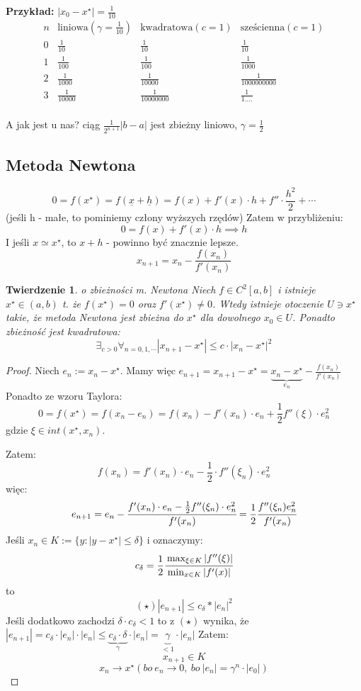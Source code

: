\documentclass[hidelinks,a4paper,fleqn,oneside]{book}
\newcommand{\ra}{\rightarrow}
\newtheorem{twierdz}{Twierdzenie}
\begin{document}
\textbf{Przykład:} $|x_0 - x^\star| = \frac{1}{10}$
\[
\begin{array}{c|c|c|c}
n & \textrm{liniowa} (\gamma = \frac{1}{10}) & \textrm{kwadratowa} (c = 1) & \textrm{sześcienna} (c=1) \\ \hline
0 & \frac{1}{10} & \frac{1}{10} & \frac{1}{10} \\
1 & \frac{1}{100} & \frac{1}{100} & \frac{1}{1000} \\
2 & \frac{1}{1000} & \frac{1}{10000} & \frac{1}{1000000000} \\
3 & \frac{1}{10000} & \frac{1}{10000000} & \frac{1}{1....} \\
\end{array}
\]

A jak jest u nas? ciąg $\frac{1}{2^{n+1}}|b-a|$ jest zbieżny liniowo, $\gamma = \frac{1}{2}$

\subsection{Metoda Newtona}

\[
	0 = f(x^\star) = f(\underline{x} + \underline{h}) = f(x) + f'(x)\cdot h + f''\cdot\frac{h^2}{2} + \cdots
\]
(jeśli h - małe, to pominiemy człony wyższych rzędów)
Zatem w przybliżeniu:
\[
	0 = f(x) + f'(x) \cdot h \implies h
\]
I jeśli $x \simeq x^\star$, to $x+h$ - powinno być znacznie lepsze.
\[
	x_{n+1} = x_n - \frac{f(x_n)}{f'(x_n)}
\]

\begin{twierdz}{o zbieżności m. Newtona}
	Niech $f \in C^2[a, b]$ i istnieje $x^\star \in (a, b)$ t. że $f(x^\star) = 0$ oraz $f'(x^\star) \neq 0$. Wtedy istnieje otoczenie $U \ni x^\star$ takie, że metoda Newtona jest zbieżna do $x^\star$ dla dowolnego $x_0 \in U$. Ponadto zbieżność jest kwadratowa:
	\[
		\exists_{c>0} \forall_{n = 0, 1, \cdots} |x_{n+1} - x^\star| \leq c \cdot |x_n - x^\star|^2
	\]
\end{twierdz}

\begin{proof}
	Niech $e_n := x_n - x^\star$. Mamy więc $e_{n+1} = x_{n+1} - x^\star = \underbrace{x_n - x^\star}_{e_n} - \frac{f(x_n)}{f'(x_n)}$
	Ponadto ze wzoru Taylora:
	\[
	0 = f(x^\star) = f(x_n - e_n) = f(x_n) - f'(x_n)\cdot e_n + \frac{1}{2}f''(\xi)\cdot e_n^2
	\]
	gdzie
	$\xi \in int(x^\star, x_n)$.
	
	Zatem:
	\[
		f(x_n) = f'(x_n) \cdot e_n - \frac{1}{2} \cdot f''(\xi_n) \cdot e_n^2
	\]
	więc:
	\[
		e_{n+1} = e_n - \cfrac{f'(x_n)\cdot e_n - \frac{1}{2}f''(\xi_n)\cdot e_n^2}{f'(x_n)} = \frac{1}{2}\cfrac{f''(\xi_n)e_n^2}{f'(x_n)}
	\]
	Jeśli $x_n \in K := \{y : |y - x^\star| \leq \delta\}$
	i oznaczymy:
	\[
		c_\delta = \frac{1}{2} \cfrac{\max_{\xi \in K} |f''(\xi)|}{\min_{x \in K}|f'(x)|}
	\]
	to
	\[
		(\star) |e_{n+1}| \leq c_\delta * |e_n|^2
	\]
	Jeśli dodatkowo zachodzi $\delta \cdot c_\delta < 1$ to z $(\star)$ wynika, że $|e_{n+1}| = c_\delta \cdot |e_n| \cdot |e_n| \leq \underbrace{c_\delta \cdot \delta}_{\gamma} \cdot |e_n| = \underbrace{\gamma}_{<1} \cdot |e_n|$
	Zatem:
	\[
		x_{n+1} \in K
	\]
	\[
		x_n \ra x^\star (bo\ e_n \ra 0,\ bo\ |e_n| = \gamma^n\cdot|e_0|)
	\]
\end{proof}
\end{document}
